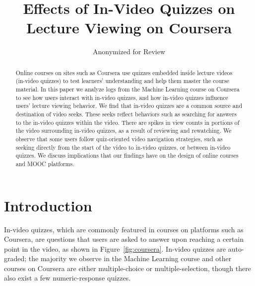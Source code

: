 \documentclass[letterpaper]{article}
\begin{document}
%

\title{Effects of In-Video Quizzes on Lecture Viewing on Coursera}
\author{Anonymized for Review}

\maketitle

\begin{abstract}
Online courses on sites such as Coursera use quizzes embedded inside lecture videos (in-video quizzes) to test learners' understanding and help them master the course material. In this paper we analyze logs from the Machine Learning course on Coursera to see how users interact with in-video quizzes, and how in-video quizzes influence users' lecture viewing behavior. We find that in-video quizzes are a common source and destination of video seeks. These seeks reflect behaviors such as searching for answers to the in-video quizzes within the video. There are spikes in view counts in portions of the video surrounding in-video quizzes, as a result of reviewing and rewatching. We observe that some users follow quiz-oriented video navigation strategies, such as seeking directly from the start of the video to in-video quizzes, or between in-video quizzes. We discuss implications that our findings have on the design of online courses and MOOC platforms. %
\end{abstract}

\section{Introduction}

In-video quizzes, which are commonly featured in courses on platforms such as Coursera, are questions that users are asked to answer upon reaching a certain point in the video, as shown in Figure~\ref{fig:coursera}. In-video quizzes are auto-graded; the majority we observe in the Machine Learning course and other courses on Coursera are either multiple-choice or multiple-selection, though there also exist a few numeric-response quizzes.
\end{document}
